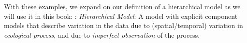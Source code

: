 With these examples,
we expand on our definition of a hierarchical model as we will use it
in this book: \newline
{: {\it Hierarchical Model}: A model with
  explicit component models that describe variation in the data due to
  (spatial/temporal) variation in {\it ecological process}, and due to
  {\it imperfect observation} of the process.
}









